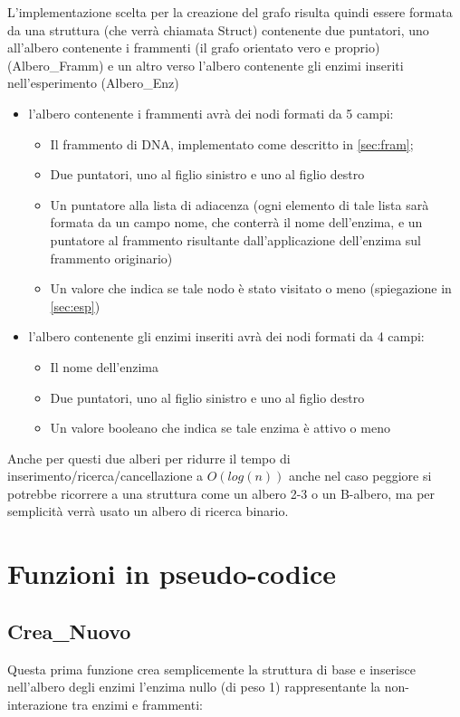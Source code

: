 \documentclass[a4paper,10pt]{article}
\begin{document}
L'implementazione scelta per la creazione del grafo risulta quindi essere formata da una struttura (che verrà chiamata Struct) contenente due puntatori, uno all'albero contenente i frammenti (il grafo orientato vero e proprio)(Albero\_{}Framm) e un altro verso l'albero contenente gli enzimi inseriti nell'esperimento (Albero\_{}Enz)
\begin{itemize}
\item l'albero contenente i frammenti avrà dei nodi formati da 5 campi: 
\begin{itemize}
\item Il frammento di DNA, implementato come descritto in \ref{sec:fram};
\item Due puntatori, uno al figlio sinistro e uno al figlio destro
\item Un puntatore alla lista di adiacenza (ogni elemento di tale lista sarà formata da un campo nome, che conterrà il nome dell'enzima, e un puntatore al frammento risultante dall'applicazione dell'enzima sul frammento originario)
\item Un valore che indica se tale nodo è stato visitato o meno (spiegazione in \ref{sec:esp})
\end{itemize}
\item l'albero contenente gli enzimi inseriti avrà dei nodi formati da 4 campi:
\begin{itemize}
\item Il nome dell'enzima
\item Due puntatori, uno al figlio sinistro e uno al figlio destro
\item Un valore booleano che indica se tale enzima è attivo o meno
\end{itemize}
\end{itemize}
Anche per questi due alberi per ridurre il tempo di inserimento/ricerca/cancellazione a $O(log(n))$ anche nel caso peggiore si potrebbe ricorrere a una struttura come un albero 2-3 o un B-albero, ma per semplicità verrà usato un albero di ricerca binario.

\section{Funzioni in pseudo-codice}
\subsection{Crea\_{}Nuovo}
Questa prima funzione crea semplicemente la struttura di base e inserisce nell'albero degli enzimi l'enzima nullo (di peso 1) rappresentante la non-interazione tra enzimi e frammenti:
\end{document}
